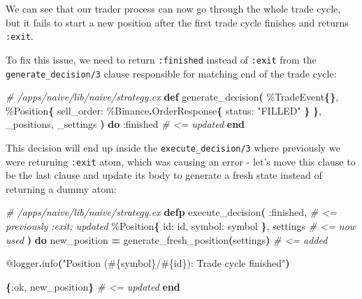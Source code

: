 \documentclass[
  oneside]{book}
\newenvironment{Shaded}{\begin{snugshade}}{\end{snugshade}}
\newcommand{\CommentTok}[1]{\textcolor[rgb]{0.56,0.35,0.01}{\textit{#1}}}
\newcommand{\ConstantTok}[1]{\textcolor[rgb]{0.56,0.35,0.01}{#1}}
\newcommand{\FunctionTok}[1]{\textcolor[rgb]{0.13,0.29,0.53}{\textbf{#1}}}
\newcommand{\KeywordTok}[1]{\textcolor[rgb]{0.13,0.29,0.53}{\textbf{#1}}}
\newcommand{\NormalTok}[1]{#1}
\newcommand{\OperatorTok}[1]{\textcolor[rgb]{0.81,0.36,0.00}{\textbf{#1}}}
\newcommand{\OtherTok}[1]{\textcolor[rgb]{0.56,0.35,0.01}{#1}}
\newcommand{\StringTok}[1]{\textcolor[rgb]{0.31,0.60,0.02}{#1}}
\newcommand{\VariableTok}[1]{\textcolor[rgb]{0.00,0.00,0.00}{#1}}
\begin{document}
We can see that our trader process can now go through the whole trade cycle, but it fails to start a new position after the first trade cycle finishes and returns \texttt{:exit}.

To fix this issue, we need to return \texttt{:finished} instead of \texttt{:exit} from the \texttt{generate\_decision/3} clause responsible for matching end of the trade cycle:

\begin{Shaded}
\begin{Highlighting}[]
  \CommentTok{\# /apps/naive/lib/naive/strategy.ex}
  \KeywordTok{def}\NormalTok{ generate\_decision}\FunctionTok{(}
\NormalTok{        \%}\ConstantTok{TradeEvent}\FunctionTok{\{\}}\NormalTok{,}
\NormalTok{        \%}\ConstantTok{Position}\FunctionTok{\{}
          \VariableTok{sell\_order:}\NormalTok{ \%}\ConstantTok{Binance}\OperatorTok{.}\ConstantTok{OrderResponse}\FunctionTok{\{}
            \VariableTok{status:} \StringTok{"FILLED"}
          \FunctionTok{\}}
        \FunctionTok{\}}\NormalTok{,}
\NormalTok{        \_positions,}
\NormalTok{        \_settings}
      \FunctionTok{)} \KeywordTok{do}
    \VariableTok{:finished} \CommentTok{\# \textless{}= updated}
  \KeywordTok{end}
\end{Highlighting}
\end{Shaded}

This decision will end up inside the \texttt{execute\_decision/3} where previously we were returning \texttt{:exit} atom, which was causing an error - let's move this clause to be the last clause and update its body to generate a fresh state instead of returning a dummy atom:

\begin{Shaded}
\begin{Highlighting}[]
  \CommentTok{\# /apps/naive/lib/naive/strategy.ex}
  \KeywordTok{defp}\NormalTok{ execute\_decision}\FunctionTok{(}
         \VariableTok{:finished}\NormalTok{, }\CommentTok{\# \textless{}= previously :exit; updated}
\NormalTok{         \%}\ConstantTok{Position}\FunctionTok{\{}
           \VariableTok{id:}\NormalTok{ id,}
           \VariableTok{symbol:}\NormalTok{ symbol}
         \FunctionTok{\}}\NormalTok{,}
\NormalTok{         settings }\CommentTok{\# \textless{}= now used}
       \FunctionTok{)} \KeywordTok{do}
\NormalTok{    new\_position }\OperatorTok{=}\NormalTok{ generate\_fresh\_position}\FunctionTok{(}\NormalTok{settings}\FunctionTok{)} \CommentTok{\# \textless{}= added}

    \OtherTok{@logger}\OperatorTok{.}\NormalTok{info}\FunctionTok{(}\StringTok{"Position (}\OtherTok{\#\{}\NormalTok{symbol}\OtherTok{\}}\StringTok{/}\OtherTok{\#\{}\NormalTok{id}\OtherTok{\}}\StringTok{): Trade cycle finished"}\FunctionTok{)}

    \FunctionTok{\{}\VariableTok{:ok}\NormalTok{, new\_position}\FunctionTok{\}} \CommentTok{\# \textless{}= updated}
  \KeywordTok{end}
\end{Highlighting}
\end{Shaded}
\end{document}
